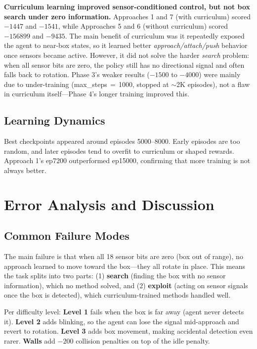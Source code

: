 \documentclass[10.5pt, oneside]{article}
\begin{document}
\textbf{Curriculum learning improved sensor-conditioned control, but not box search under zero information.} Approaches 1 and 7 (with curriculum) scored $-1447$ and $-1541$, while Approaches 5 and 6 (without curriculum) scored $-156899$ and $-9435$. The main benefit of curriculum was it repeatedly exposed the agent to near-box states, so it learned better \textit{approach/attach/push} behavior once sensors became active. However, it did not solve the harder \textit{search} problem: when all sensor bits are zero, the policy still has no directional signal and often falls back to rotation. Phase 3's weaker results ($-1500$ to $-4000$) were mainly due to under-training (max\_steps$\,{=}\,$1000, stopped at $\sim$2K episodes), not a flaw in curriculum itself---Phase 4's longer training improved this.


\subsection{Learning Dynamics}

Best checkpoints appeared around episodes 5000--8000. Early episodes are too random, and later episodes tend to overfit to curriculum or shaped rewards. Approach 1's ep7200 outperformed ep15000, confirming that more training is not always better.

\section{Error Analysis and Discussion}

\subsection{Common Failure Modes}

The main failure is that when all 18 sensor bits are zero (box out of range), no approach learned to move toward the box---they all rotate in place. This means the task splits into two parts: (1) \textbf{search} (finding the box with no sensor information), which no method solved, and (2) \textbf{exploit} (acting on sensor signals once the box is detected), which curriculum-trained methods handled well.

Per difficulty level: \textbf{Level 1} fails when the box is far away (agent never detects it). \textbf{Level 2} adds blinking, so the agent can lose the signal mid-approach and revert to rotation. \textbf{Level 3} adds box movement, making accidental detection even rarer. \textbf{Walls} add $-200$ collision penalties on top of the idle penalty.
\end{document}
